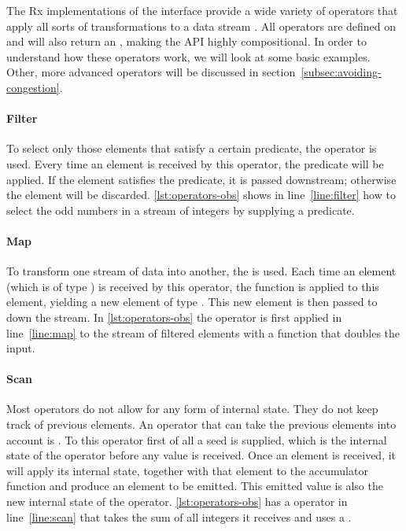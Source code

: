 The Rx implementations of the \obs interface provide a wide variety of operators that apply all sorts of transformations to a data stream \cite{rx-api}. All operators are defined on \obs and will also return an \obs, making the API highly compositional. In order to understand how these operators work, we will look at some basic examples. Other, more advanced operators will be discussed in section~\ref{subsec:avoiding-congestion}.

\paragraph{Filter}To select only those elements that satisfy a certain predicate, the operator  is used. Every time an element is received by this operator, the predicate  will be applied. If the element satisfies the predicate, it is passed downstream; otherwise the element will be discarded. \autoref{lst:operators-obs} shows in line~\ref{line:filter} how to select the odd numbers in a stream of integers by supplying a predicate.

\paragraph{Map}To transform one stream of data into another, the  is used. Each time an element (which is of type ) is received by this operator, the function  is applied to this element, yielding a new element of type . This new element is then passed to down the stream. In \autoref{lst:operators-obs} the  operator is first applied in line~\ref{line:map} to the stream of filtered elements with a function that doubles the input.

\paragraph{Scan}Most operators do not allow for any form of internal state. They do not keep track of previous elements. An operator that can take the previous elements into account is . To this operator first of all a seed is supplied, which is the internal state of the operator before any value is received. Once an element is received, it will apply its internal state, together with that element to the accumulator function  and produce an element to be emitted. This emitted value is also the new internal state of the operator. \autoref{lst:operators-obs} has a  operator in line~\ref{line:scan} that takes the sum of all integers it receives and uses a .

